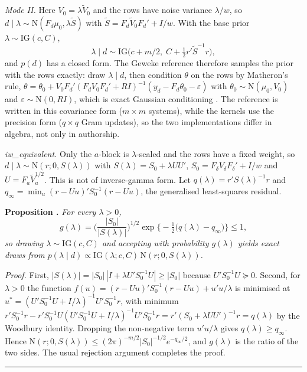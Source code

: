 \emph{Mode II.}
Here $V_0 = \lambda\tilde V_0$ and the rows have noise variance $\lambda/w$, so
$d \mid \lambda \sim \mathrm{N}(F_d\mu_0, \lambda\tilde S)$ with $\tilde S = F_d\tilde V_0F_d' +
I/w$.
With the base prior $\lambda \sim \mathrm{IG}(c, C)$,
\begin{equation}\label{eq:dummy-mode2}
\lambda \mid d \sim \mathrm{IG}\big(c + m/2,\; C + \tfrac12 r'\tilde S^{-1} r\big),
\end{equation}
and $p(d)$ has a closed form.
The Geweke reference therefore samples the prior with the rows exactly: draw $\lambda \mid d$, then
condition $\theta$ on the rows by Matheron's rule, $\theta = \theta_0 + V_0F_d'(F_dV_0F_d' + RI)^{-1}(y_d
- F_d\theta_0 - \varepsilon)$ with $\theta_0 \sim \mathrm{N}(\mu_0, V_0)$ and $\varepsilon \sim
\mathrm{N}(0, RI)$, which is exact Gaussian conditioning
\citep{journel1978mining,chiles2012geostatistics,wilson2020efficiently}.
The reference is written in this covariance form ($m \times m$ systems), while the kernels use the
precision form ($q \times q$ Gram updates), so the two implementations differ in algebra, not only
in authorship.

\emph{iw\_equivalent.}
Only the $a$-block is $\lambda$-scaled and the rows have a fixed weight, so
$d \mid \lambda \sim \mathrm{N}(r; 0, S(\lambda))$ with $S(\lambda) = S_0 + \lambda UU'$, $S_0 =
F_\delta V_\delta F_\delta' + I/w$ and $U = F_a\tilde V_a^{1/2}$.
This is not of inverse-gamma form.
Let $q(\lambda) = r'S(\lambda)^{-1}r$ and $q_\infty = \min_u (r - Uu)'S_0^{-1}(r - Uu)$, the
generalised least-squares residual.

\medskip\noindent\textbf{Proposition \thesubsection.}\label{prop:envelope} \textit{For every $\lambda > 0$,}
\begin{equation}\label{eq:envelope}
g(\lambda) = \Big(\frac{|S_0|}{|S(\lambda)|}\Big)^{1/2}\exp\big\{-\tfrac12\big(q(\lambda) -
q_\infty\big)\big\} \le 1,
\end{equation}
\textit{so drawing $\lambda \sim \mathrm{IG}(c, C)$ and accepting with probability $g(\lambda)$
yields exact draws from $p(\lambda \mid d) \propto \mathrm{IG}(\lambda; c, C)\,\mathrm{N}(r; 0,
S(\lambda))$.}

\noindent\textit{Proof.}
First, $|S(\lambda)| = |S_0|\,|I + \lambda U'S_0^{-1}U| \ge |S_0|$ because $U'S_0^{-1}U \succeq 0$.
Second, for $\lambda > 0$ the function $f(u) = (r - Uu)'S_0^{-1}(r - Uu) + u'u/\lambda$ is minimised
at $u^* = (U'S_0^{-1}U + I/\lambda)^{-1}U'S_0^{-1}r$, with minimum $r'S_0^{-1}r -
r'S_0^{-1}U(U'S_0^{-1}U + I/\lambda)^{-1}U'S_0^{-1}r = r'(S_0 + \lambda UU')^{-1}r = q(\lambda)$
by the Woodbury identity.
Dropping the non-negative term $u'u/\lambda$ gives $q(\lambda) \ge q_\infty$.
Hence $\mathrm{N}(r; 0, S(\lambda)) \le (2\pi)^{-m/2}|S_0|^{-1/2}e^{-q_\infty/2}$, and $g(\lambda)$
is the ratio of the two sides.
The usual rejection argument completes the proof.
\hfill\rule{0.5em}{0.5em}

